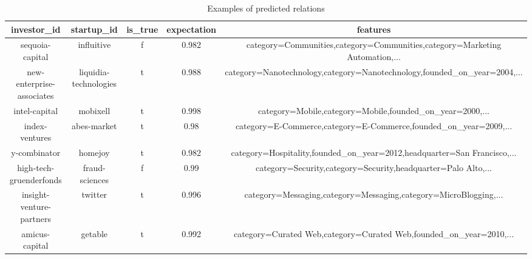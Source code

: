 \begin{table*}[!t]
\centering
\begin{tabular}{c|c|c|c|c}

\hline

investor\_id &  startup\_id & is\_true & expectation & features \\
\hline
sequoia-capital & influitive   &   f   &   0.982   &   category=Communities,category=Communities,category=Marketing Automation,...\\
new-enterprise-associates   &   liquidia-technologies   &   t   &   0.988   &   category=Nanotechnology,category=Nanotechnology,founded\_on\_year=2004,...\\
intel-capital   &   mobixell   &   t   &   0.998   &   category=Mobile,category=Mobile,founded\_on\_year=2000,...\\
index-ventures & abes-market   &   t   &   0.98   &   category=E-Commerce,category=E-Commerce,founded\_on\_year=2009,...\\
y-combinator   &   homejoy & t   &   0.982   &   category=Hospitality,founded\_on\_year=2012,headquarter=San Francisco,...\\
high-tech-gruenderfonds & fraud-sciences & f   &   0.99   &   category=Security,category=Security,headquarter=Palo Alto,...\\
insight-venture-partners   &   twitter & t   &   0.996   &   category=Messaging,category=Messaging,category=MicroBlogging,...\\
amicus-capital  & getable & t   &   0.992   &   category=Curated Web,category=Curated Web,founded\_on\_year=2010,...\\
\hline
\end{tabular}
\caption{Examples of predicted relations}\label{table:result}
\end{table*}